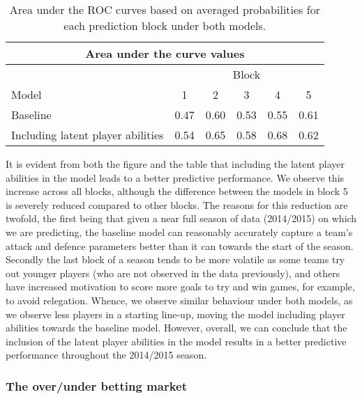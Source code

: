 \documentclass[11pt,a4paper]{article}
\begin{document}
\begin{table}%
\caption{Area under the ROC curves based on averaged probabilities for each prediction block under both models.} \label{tableroc}
\centering
\begin{tabular}{l|ccccc}
\hline
\multicolumn{6}{c}{Area under the curve values}\\
\hline
& \multicolumn{5}{c}{Block}\\
Model & 1 & 2 & 3 & 4 & 5 \\
\hline
Baseline & 0.47 & 0.60 & 0.53 & 0.55 & 0.61 \\
Including latent player abilities & 0.54 & 0.65 & 0.58 & 0.68 & 0.62 \\
\hline
\end{tabular}
\end{table}




It is evident from both the figure and the table that including the 
latent player abilities in the model leads to a better predictive 
performance. We observe this increase across all blocks, although the 
difference between the models in block 5 is severely reduced compared 
to other blocks. The reasons for this reduction are twofold, the first 
being that given a near full season of data (2014/2015) on which we 
are predicting, the baseline model can reasonably accurately capture a 
team's attack and defence parameters better than it can towards the 
start of the season. Secondly the last block of a season tends to be 
more volatile as some teams try out younger players (who are not 
observed in the data previously), and others have increased motivation 
to score more goals to try and win games, for example, to avoid 
relegation. Whence, we observe similar behaviour under both models, as 
we observe less players in a starting line-up, moving the model 
including player abilities towards the baseline model. However, overall, 
we can conclude that the inclusion of the latent player abilities in 
the model results in a better predictive performance throughout the 
2014/2015 season.




    \subsubsection*{The over/under betting market} 
\end{document}
